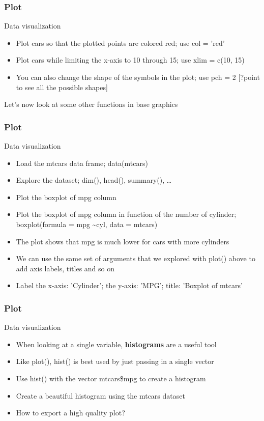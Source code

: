 \documentclass{beamer}
\begin{document}
\begin{frame}[fragile]
	\frametitle{Plot}
	\centering \Large Data visualization
	\begin{itemize}
		\small
		\item Plot cars so that the plotted points are colored red; use col = 'red'
	\pause 
		\item Plot cars while limiting the x-axis to 10 through 15; use xlim = c(10, 15)
	\pause
		\item You can also change the shape of the symbols in the plot; use pch = 2 \tiny [?point to see all the possible shapes]
	\end{itemize}

	\vspace{20pt}

	\begin{center} Let's now look at some other functions in base graphics \end{center}
\end{frame}


\begin{frame}[fragile]
	\frametitle{Plot}
	\centering \Large Data visualization
	\begin{itemize}
		\small
		\item Load the mtcars data frame; data(mtcars)
	\pause 
		\item Explore the dataset; dim(), head(), summary(), \ldots
	\pause
		\item Plot the boxplot of mpg column
	\pause
		\item Plot the boxplot of mpg column in function of the number of cylinder; boxplot(formula = mpg \textasciitilde cyl, data = mtcars)
	\pause
		\item The plot shows that mpg is much lower for cars with more cylinders
		\item We can use the same set of arguments that we explored with plot() above to add axis labels, titles and so on
		\item Label the x-axis: 'Cylinder'; the y-axis: 'MPG'; title: 'Boxplot of mtcars'
	\end{itemize}
\end{frame}

\begin{frame}[fragile]
	\frametitle{Plot}
	\centering \Large Data visualization
	\begin{itemize}
		\small
	\item When looking at a single variable, \textbf{histograms} are a useful tool
		\item Like plot(), hist() is best used by just passing in a single vector
		\item Use hist() with the vector mtcars\$mpg to create a histogram
	\pause
		\item Create a beautiful histogram using the mtcars dataset 
	\pause
		\item How to export a high quality plot?
	\end{itemize}
\end{frame}
\end{document}
